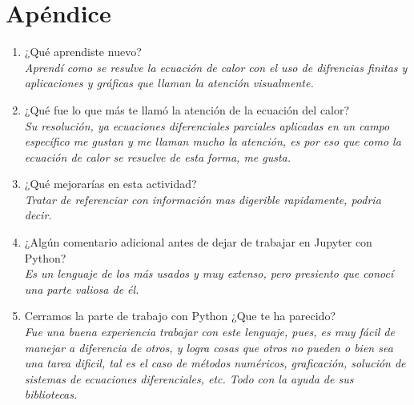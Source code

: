 \documentclass[12pt]{article}
\begin{document}
\section*{Apéndice}
\begin{enumerate}

\item ¿Qué aprendiste nuevo?\\
\textit{Aprendí como se resulve la ecuación de calor con el uso de difrencias finitas y aplicaciones y gráficas que llaman la atención visualmente.}

\item ¿Qué fue lo que más te llamó la atención de la ecuación del calor?\\
\textit{Su resolución, ya ecuaciones diferenciales parciales aplicadas en un campo específico me gustan y me llaman mucho la atención, es por eso que como la ecuación de calor se resuelve de esta forma, me gusta.}

\item ¿Qué mejorarías en esta actividad?\\
\textit{Tratar de referenciar con información mas digerible rapidamente, podria decir.}

\item ¿Algún comentario adicional antes de dejar de trabajar en Jupyter con Python?\\
\textit{Es un lenguaje de los más usados y muy extenso, pero presiento que conocí una parte valiosa de él.}

\item Cerramos la parte de trabajo con Python ¿Que te ha parecido?\\
\textit{Fue una buena experiencia trabajar con este lenguaje, pues, es muy fácil de manejar a diferencia de otros, y logra cosas que otros no pueden o bien sea una tarea dificil, tal es el caso de métodos numéricos, graficación, solución de sistemas de ecuaciones diferenciales, etc. Todo con la ayuda de sus bibliotecas.}

\end{enumerate}
\end{document}
